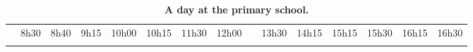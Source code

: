 \begin{landscape}
\begin{table}
	\shorthandoff{-}
	\begin{tabular}{
	 p{1mm} 	%
	|p{6mm}
	|p{20mm}
	|p{25mm}
	|p{7mm}
	|p{30mm}
	|p{1mm} 	%
	|p{5mm} 	%
	|p{1mm} 	%
	|p{23mm}
	|p{30mm}
	|p{8mm}
	|p{23mm}
	|p{8mm}
	|p{8mm}}
		\multicolumn{1}{l}{} &
		\multicolumn{1}{l}{\hspace{-5mm}8h30} & 	%
		\multicolumn{1}{l}{\hspace{-5mm}8h40} &  	%
		\multicolumn{1}{l}{\hspace{-5mm}9h15} & 	%
		\multicolumn{1}{l}{\hspace{-9mm}10h00} &  	%
		\multicolumn{1}{l}{\hspace{-7mm}10h15} &  	%
		\multicolumn{1}{l}{\hspace{-8mm}11h30} &  	%
		\multicolumn{1}{l}{\hspace{0mm}12h00} &
		\multicolumn{1}{l}{} &
		\multicolumn{1}{l}{\hspace{-6mm}13h30} & 	%
		\multicolumn{1}{l}{\hspace{-8mm}14h15} & 	%
		\multicolumn{1}{l}{\hspace{-8mm}15h15} &  	%
		\multicolumn{1}{l}{\hspace{-8mm}15h30} & 	%
		\multicolumn{1}{l}{\hspace{-8mm}16h15} &  	%
		\multicolumn{1}{l}{\hspace{-8mm}16h30}  \\ 	%
		\cline{2-6}\cline{8-8}\cline{10-14}
		 & & & & \cellcolor{gray!50} & & & & & & &  \cellcolor{gray!50}& & &
		\multicolumn{1}{l}{} \\ [15mm]
		\cline{2-6}\cline{8-8}\cline{10-14}
	\end{tabular}
	\hfill
	\caption{\textbf{A day at the primary school.}}
\end{table}
\end{landscape}